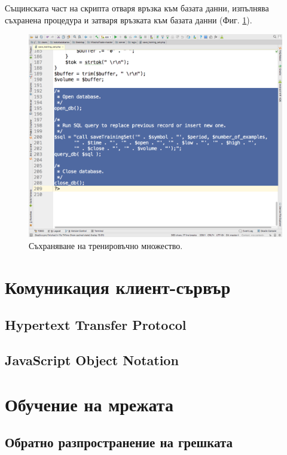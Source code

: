 \documentclass[book,14pt,oneside,openany]{memoir}
\begin{document}
Същинската част на скрипта отваря връзка към базата данни, изпълнява съхранена процедура и затваря връзката към базата данни (Фиг. \ref{fig:pic0153}).

\begin{figure}[h]
  \centering
  \includegraphics[height=0.45\pdfpageheight]{pic0153}
  \caption{Съхраняване на тренировъчно множество.}
\label{fig:pic0153}
\end{figure}
\FloatBarrier

\newpage
\chapter{Комуникация клиент-сървър}
\label{chapter06}

\section{Hypertext Transfer Protocol}

\section{JavaScript Object Notation}

\newpage
\chapter{Обучение на мрежата}
\label{chapter07}

\section{Обратно разпространение на грешката}
\end{document}
